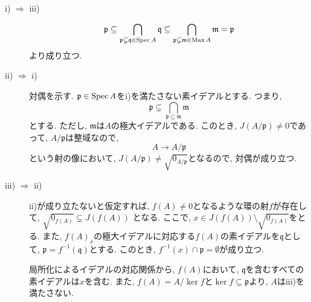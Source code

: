 \documentclass[dvipdfmx]{jsarticle}
\begin{document}
    \begin{problem}
        \begin{description}
            \item[i) $\Rightarrow$ iii)]
            \[
                \mathfrak{p} \subseteq \bigcap_{\mathfrak{p} \subsetneq \mathfrak{q} \in \operatorname{Spec}{A}} \mathfrak{q} \subseteq \bigcap_{\mathfrak{p} \subsetneq \mathfrak{m} \in \operatorname{Max}{A}} \mathfrak{m} = \mathfrak{p}
            \]
            より成り立つ.
            \item[ii) $\Rightarrow$ i)] 対偶を示す.
            $\mathfrak{p} \in \operatorname{Spec}{A}$をi)を満たさない素イデアルとする.
            つまり,
            \[
                \mathfrak{p} \subsetneq \bigcap_{\mathfrak{p} \subseteq \mathfrak{m}} \mathfrak{m}
            \]
            とする.
            ただし, $\mathfrak{m}$は$A$の極大イデアルである.
            このとき, $J(A/\mathfrak{p}) \neq 0$であって, $A/\mathfrak{p}$は整域なので,
            \[
                A \longrightarrow  A/\mathfrak{p}
            \]
            という射の像において, $J(A/\mathfrak{p}) \neq \sqrt{0_{A/\mathfrak{p}}}$となるので, 対偶が成り立つ.
            \item[iii) $\Rightarrow$ ii)]
            ii)が成り立たないと仮定すれば, $f(A) \neq 0$となるような環の射$f$が存在して,
            $\sqrt{0_{f(A)}} \subsetneq J(f(A))$
            となる.
            ここで, $x \in J(f(A)) \setminus \sqrt{0_{f(A)}}$をとる.
            また, $f(A)_x$の極大イデアルに対応する$f(A)$の素イデアルを$\mathfrak{q}$として,
            $\mathfrak{p} = f^{-1}(\mathfrak{q})$とする.
            このとき, $f^{-1}(x) \cap \mathfrak{p} = \emptyset$が成り立つ.

            局所化によるイデアルの対応関係から, $f(A)$において, $\mathfrak{q}$を含むすべての素イデアルは$x$を含む.
            また, $f(A) = A/\ker{f}$と$\ker{f} \subseteq \mathfrak{p}$より,
            $A$はiii)を満たさない.

        \end{description}
    \end{problem}
\end{document}
